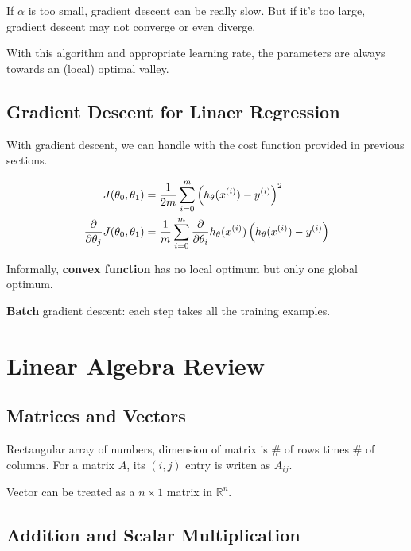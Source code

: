 \documentclass[en,11pt,english,black,simple]{../elegantbook}
\begin{document}
If \(\alpha\) is too small, gradient descent can be really slow. But if it's too large, gradient descent may not converge or even diverge.


With this algorithm and appropriate learning rate, the parameters are always towards an (local) optimal valley.

\subsection{Gradient Descent for Linaer Regression}

With gradient descent, we can handle with the cost function provided in previous sections.

\[
\begin{aligned}
    J (\theta_0, \theta_1) &= \frac{1}{2 m} \sum_{i = 0}^{m} \left(h_\theta(x^{(i)}) - y^{(i)}\right)^2\\
    \frac{\partial{}}{\partial{}\theta_j} J (\theta_0, \theta_1) &= \frac{1}{m} \sum_{i = 0}^{m} \frac{\partial{}}{\partial{}\theta_i} h_\theta(x^{(i)}) \left(h_\theta(x^{(i)}) - y^{(i)}\right)
\end{aligned}
\]

Informally, \textbf{convex function} has no local optimum but only one global optimum.

\textbf{Batch} gradient descent: each step takes all the training examples.


\section{Linear Algebra Review}

\subsection{Matrices and Vectors}

\begin{definition}[Matrix]
    Rectangular array of numbers, dimension of matrix is \# of rows times \# of columns.
    For a matrix \(A\), its \((i,j)\) entry is writen as \(A_{ij}\).
\end{definition}

\begin{definition}[Vector]
    Vector can be treated as a \(n \times 1\) matrix in \(\mathbb{R}^n\).
\end{definition}


\subsection{Addition and Scalar Multiplication}
\end{document}
